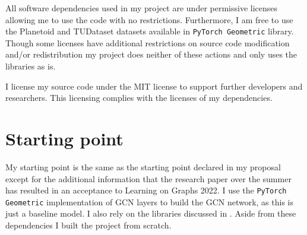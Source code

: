 All software dependencies used in my project are under permissive licenses allowing me to use the code with no restrictions.
Furthermore, I am free to use the Planetoid \cite{planetoid} and TUDataset \cite{Morris+2020} datasets available in \texttt{PyTorch Geometric} library.
Though some licenses have additional restrictions on source code modification and/or redistribution my project does neither of these actions and only uses the libraries as is.

I license my source code under the MIT license to support further developers and researchers.
This licensing complies with the licenses of my dependencies.


\section{Starting point}

My starting point is the same as the starting point declared in my proposal except for the additional information that the research paper over the summer has resulted in an acceptance to Learning on Graphs 2022.
I use the \texttt{PyTorch Geometric} implementation of GCN layers to build the GCN network, as this is just a baseline model. I also rely on the libraries discussed in .
Aside from these dependencies I built the project from scratch.

